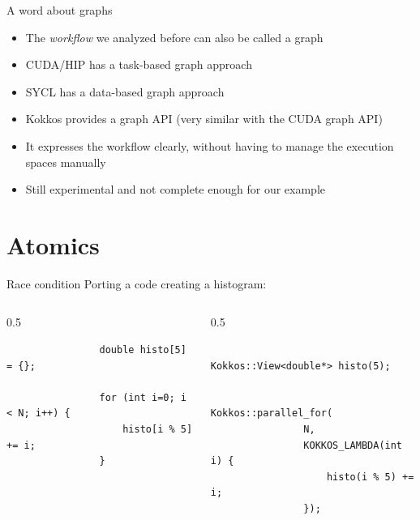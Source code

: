 \documentclass[
    aspectratio=169,
]{beamer}
\begin{document}
\begin{frame}{A word about graphs}
    \begin{itemize}
        \item The \emph{workflow} we analyzed before can also be called a graph
        \item CUDA/HIP has a task-based graph approach
        \item SYCL has a data-based graph approach
        \pause
        \item Kokkos provides a graph API (very similar with the CUDA graph API)
        \item It expresses the workflow clearly, without having to manage the execution spaces manually
        \pause
        \item Still experimental and not complete enough for our example
    \end{itemize}
\end{frame}

\section{Atomics}

\begin{frame}[fragile]{Race condition}
    Porting a code creating a histogram:
    \begin{columns}
        \begin{column}{0.5\linewidth}
            \begin{verbatim}
                double histo[5] = {};

                for (int i=0; i < N; i++) {
                    histo[i % 5] += i;
                }
            \end{verbatim}
        \end{column}
        \pause
        \begin{column}{0.5\linewidth}
            \begin{verbatim}
                Kokkos::View<double*> histo(5);

                Kokkos::parallel_for(
                N,
                KOKKOS_LAMBDA(int i) {
                    histo(i % 5) += i;
                });
            \end{verbatim}
        \end{column}
    \end{columns}
\end{frame}

\end{document}
